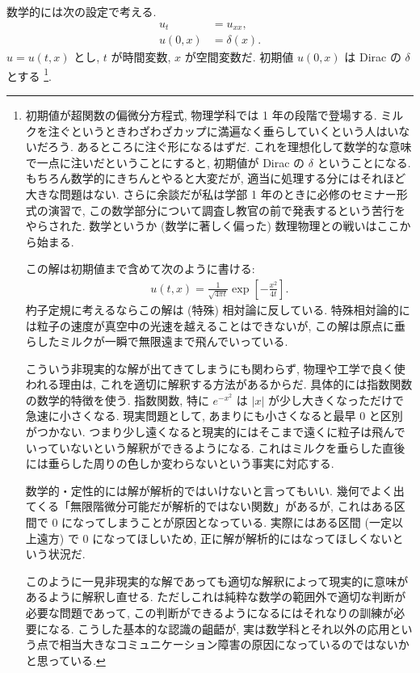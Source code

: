 \documentclass[openany, a4paper, oneside]{jsbook}
\begin{document}
数学的には次の設定で考える.
\begin{align}
 u_t &     = u_{xx}, \\
 u (0, x) & = \delta (x).
\end{align}
$u = u (t,x)$ とし, $t$ が時間変数, $x$ が空間変数だ.
初期値 $u (0, x)$ は Dirac の $\delta$ とする \footnote{初期値が超関数の偏微分方程式, 物理学科では 1 年の段階で登場する.
ミルクを注ぐというときわざわざカップに満遍なく垂らしていくという人はいないだろう.
あるところに注ぐ形になるはずだ.
これを理想化して数学的な意味で一点に注いだということにすると,
初期値が Dirac の $\delta$ ということになる.
もちろん数学的にきちんとやると大変だが, 適当に処理する分にはそれほど大きな問題はない.
さらに余談だが私は学部 1 年のときに必修のセミナー形式の演習で,
この数学部分について調査し教官の前で発表するという苦行をやらされた.
数学というか (数学に著しく偏った) 数理物理との戦いはここから始まる.

この解は初期値まで含めて次のように書ける:
\begin{align}
 u (t, x) = \frac{1}{\sqrt{4 \pi t}} \exp \left[ - \frac{x^2}{4 t} \right].
\end{align}
杓子定規に考えるならこの解は (特殊) 相対論に反している.
特殊相対論的には粒子の速度が真空中の光速を越えることはできないが,
この解は原点に垂らしたミルクが一瞬で無限遠まで飛んでいっている.

こういう非現実的な解が出てきてしまうにも関わらず, 物理や工学で良く使われる理由は,
これを適切に解釈する方法があるからだ.
具体的には指数関数の数学的特徴を使う.
指数関数, 特に $e^{-x^2}$ は $\left| x \right|$ が少し大きくなっただけで急速に小さくなる.
現実問題として, あまりにも小さくなると最早 0 と区別がつかない.
つまり少し遠くなると現実的にはそこまで遠くに粒子は飛んでいっていないという解釈ができるようになる.
これはミルクを垂らした直後には垂らした周りの色しか変わらないという事実に対応する.

数学的・定性的には解が解析的ではいけないと言ってもいい.
幾何でよく出てくる「無限階微分可能だが解析的ではない関数」があるが,
これはある区間で 0 になってしまうことが原因となっている.
実際にはある区間 (一定以上遠方) で 0 になってほしいため, 正に解が解析的にはなってほしくないという状況だ.

このように一見非現実的な解であっても適切な解釈によって現実的に意味があるように解釈し直せる.
ただしこれは純粋な数学の範囲外で適切な判断が必要な問題であって,
この判断ができるようになるにはそれなりの訓練が必要になる.
こうした基本的な認識の齟齬が,
実は数学科とそれ以外の応用という点で相当大きなコミュニケーション障害の原因になっているのではないかと思っている.}.
\end{document}
